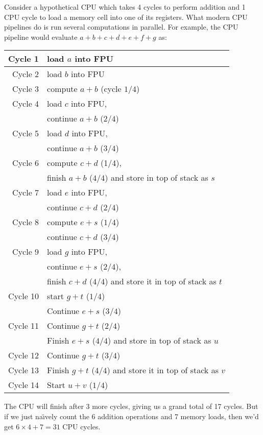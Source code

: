 \begin{ex}
  Consider a hypothetical CPU which takes 4 cycles to perform
  addition and 1 CPU cycle to load a memory cell into one of its
  registers. What modern CPU pipelines do is run several computations in
  parallel. For example, the CPU pipeline would evaluate $a+b+c+d+e+f+g$ as:
  \begin{center}
    \begin{longtable}{r|l}
      Cycle 1  & load $a$ into FPU\\\hline
      Cycle 2  & load $b$ into FPU\\\hline
      Cycle 3  & compute $a+b$ (cycle $1/4$)\\\hline
      Cycle 4  & load $c$ into FPU,\\
               & continue $a+b$ ($2/4$)\\\hline
      Cycle 5  & load $d$ into FPU,\\
               & continue $a+b$ ($3/4$)\\\hline
      Cycle 6  & compute $c+d$ (1/4),\\
               & finish $a+b$ ($4/4$) and store in top of stack as $s$\\\hline
      Cycle 7  & load $e$ into FPU,\\
               & continue $c+d$ ($2/4$)\\\hline
      Cycle 8  & compute $e+s$ ($1/4$)\\
               & continue $c+d$ ($3/4$)\\\hline
      Cycle 9  & load $g$ into FPU,\\
               & continue $e+s$ ($2/4$),\\
               & finish $c+d$ ($4/4$) and store it in top of stack as $t$\\\hline
      Cycle 10 & start $g+t$ ($1/4$)\\
               & Continue $e+s$ ($3/4$)\\\hline
      Cycle 11 & Continue $g+t$ ($2/4$)\\
               & Finish $e+s$ ($4/4$) and store in top of stack as $u$\\\hline
      Cycle 12 & Continue $g+t$ ($3/4$)\\\hline
      Cycle 13 & Finish $g+t$ ($4/4$) and store it in top of stack as $v$\\\hline
      Cycle 14 & Start $u+v$ ($1/4$)
    \end{longtable}
  \end{center}
  The CPU will finish after 3 more cycles, giving us a grand total of 17
  cycles. But if we just na\"{\i}vely count the 6 addition operations
  and 7 memory loads, then we'd get $6\times4 + 7=31$ CPU cycles.
\end{ex}

